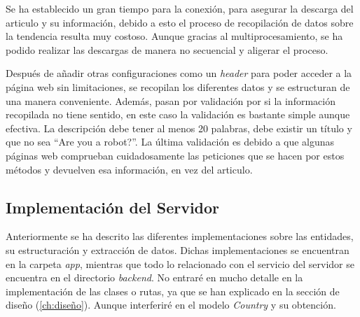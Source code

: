 \vspace{0.3cm}

Se ha establecido un gran tiempo para la conexión, para asegurar la descarga del articulo y su información, debido a esto el proceso de recopilación de datos sobre la tendencia resulta muy costoso. Aunque gracias al multiprocesamiento, se ha podido realizar las descargas de manera no secuencial y aligerar el proceso.

\vspace{0.3cm}

Después de añadir otras configuraciones como un \textit{header} para poder acceder a la página web sin limitaciones, se recopilan los diferentes datos y se estructuran de una manera conveniente. Además, pasan por validación por si la información recopilada no tiene sentido, en este caso la validación es bastante simple aunque efectiva. La descripción debe tener al menos 20 palabras, debe existir un título y que no sea \enquote{Are you a robot?}. La última validación es debido a que algunas páginas web comprueban cuidadosamente las peticiones que se hacen por estos métodos y devuelven esa información, en vez del articulo.

\subsection{Implementación del Servidor}
Anteriormente se ha descrito las diferentes implementaciones sobre las entidades, su estructuración y extracción de datos. Dichas implementaciones se encuentran en la carpeta \textit{app}, mientras que todo lo relacionado con el servicio del servidor se encuentra en el directorio \textit{backend}. No entraré en mucho detalle en la implementación de las clases o rutas, ya que se han explicado en la sección de diseño (\ref{ch:diseño}). Aunque interferiré en el modelo \textit{Country} y su obtención.

\vspace{0.3cm}

